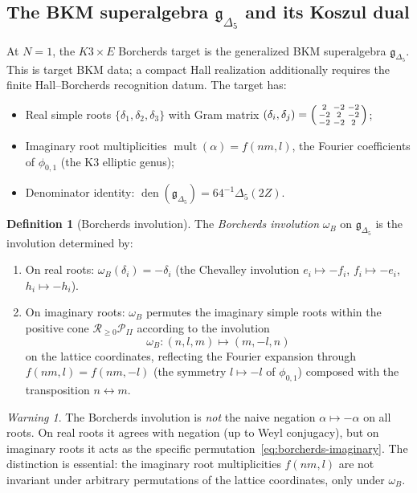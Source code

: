 \documentclass[11pt]{article}
\theoremstyle{definition}
\newtheorem{definition}[theorem]{Definition}
\theoremstyle{remark}
\newtheorem{warning}[theorem]{Warning}
\DeclareMathOperator{\mult}{mult}
\newcommand{\fkg}{\mathfrak{g}}
\newcommand{\cR}{\mathcal{R}}
\begin{document}
\subsection{The BKM superalgebra $\fkg_{\Delta_5}$ and its Koszul dual}

At $N=1$, the $K3\times E$ Borcherds target is the generalized BKM
superalgebra $\fkg_{\Delta_5}$. This is target BKM data; a compact
Hall realization additionally requires the finite Hall--Borcherds
recognition datum. The target has:
\begin{itemize}
\item Real simple roots $\{\delta_1, \delta_2, \delta_3\}$ with Gram
matrix
$(\delta_i, \delta_j) = \begin{psmallmatrix} 2 & -2 & -2 \\ -2 & 2 & -2 \\
-2 & -2 & 2 \end{psmallmatrix}$;
\item Imaginary root multiplicities $\mult(\alpha) = f(nm, l)$,
the Fourier coefficients of $\phi_{0,1}$ (the K3 elliptic genus);
\item Denominator identity:
$\operatorname{den}(\fkg_{\Delta_5})=64^{-1}\Delta_5(2Z)$.
\end{itemize}

\begin{definition}[Borcherds involution]
\label{def:borcherds-involution}
The \emph{Borcherds involution} $\omega_B$ on $\fkg_{\Delta_5}$ is the
involution determined by:
\begin{enumerate}[label=(\roman*)]
\item On real roots: $\omega_B(\delta_i) = -\delta_i$ (the Chevalley
involution $e_i \mapsto -f_i$, $f_i \mapsto -e_i$,
$h_i \mapsto -h_i$).
\item On imaginary roots: $\omega_B$ permutes the imaginary simple
roots within the positive cone $\cR_{\geq 0} \mathcal{P}_{II}$
according to the involution
\begin{equation}\label{eq:borcherds-imaginary}
\omega_B \colon (n, l, m) \longmapsto (m, -l, n)
\end{equation}
on the lattice coordinates, reflecting the Fourier expansion through
$f(nm, l) = f(nm, -l)$ (the symmetry $l \mapsto -l$ of
$\phi_{0,1}$) composed with the transposition $n \leftrightarrow m$.
\end{enumerate}
\end{definition}

\begin{warning}
The Borcherds involution is \emph{not} the naive negation
$\alpha \mapsto -\alpha$ on all roots. On real roots it agrees with
negation (up to Weyl conjugacy), but on imaginary roots it acts as
the specific permutation~\eqref{eq:borcherds-imaginary}. The
distinction is essential: the imaginary root multiplicities $f(nm, l)$
are not invariant under arbitrary permutations of the lattice
coordinates, only under $\omega_B$.
\end{warning}
\end{document}
